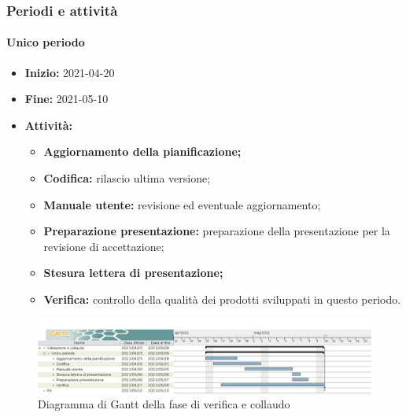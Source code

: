 \subsubsection{Periodi e attività}

\paragraph[Unico periodo]{Unico periodo}
\begin{itemize}
    \item [] \textbf{Inizio:} 2021-04-20
    \item [] \textbf{Fine:} 2021-05-10
    \item [] \textbf{Attività:}
          \begin{itemize}
              \item \textbf{Aggiornamento della pianificazione;}
              \item \textbf{Codifica:} rilascio ultima versione;
              \item \textbf{Manuale utente:} revisione ed eventuale aggiornamento;
              \item \textbf{Preparazione presentazione:} preparazione della presentazione per la revisione di accettazione;
              \item \textbf{Stesura lettera di presentazione;}
              \item \textbf{Verifica:} controllo della qualità dei prodotti sviluppati in questo periodo.
          \end{itemize}
\end{itemize}

\begin{figure}[H]
    \centering
    \includegraphics[width=1\linewidth]{res/images/pianificazione/validazione_e_collaudo.png}
    \caption{Diagramma di Gantt della fase di verifica e collaudo}
    \label{fig:_Gantt verifica e collaudo}
\end{figure}

